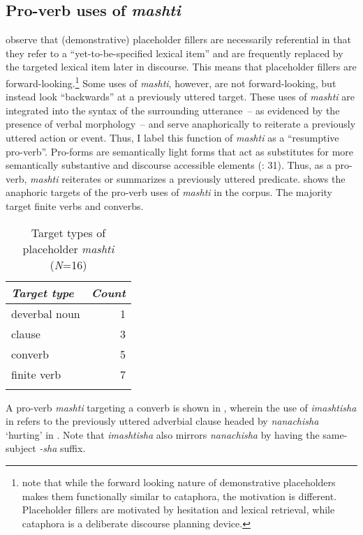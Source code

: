 \documentclass[output=paper]{langscibook}
\begin{document}
\subsection{Pro-verb uses of \textit{mashti}}
\label{sec:rice:3.3}
\citet[500]{HayashiYoon2006} observe that (demonstrative) placeholder fillers are necessarily referential in that they refer to a “yet-to-be-specified lexical item” and are frequently replaced by the targeted lexical item later in discourse. This means that placeholder fillers are forward-looking.\footnote{\citet[500]{HayashiYoon2006} note that while the forward looking nature of demonstrative placeholders makes them functionally similar to cataphora, the motivation is different. Placeholder fillers are motivated by hesitation and lexical retrieval, while cataphora is a deliberate discourse planning device.}  Some uses of \textit{mashti}, however, are not forward-looking, but instead look “backwards” at a previously uttered target. These uses of \textit{mashti} are integrated into the syntax of the surrounding utterance~-- as evidenced by the presence of verbal morphology~-- and serve anaphorically to reiterate a previously uttered action or event. Thus, I label this function of \textit{mashti} as a “resumptive pro-verb”. Pro-forms are semantically light forms that act as substitutes for more semantically substantive and discourse accessible elements (\citealt{Schachter2007}: 31). Thus, as a pro-verb, \textit{mashti} reiterates or summarizes a previously uttered predicate.  shows the anaphoric targets of the pro-verb uses of \textit{mashti} in the corpus. The majority target finite verbs and converbs.


\begin{table}
\begin{tabular}{lr}
\lsptoprule
\textit{Target type} & \textit{Count}\\
\midrule
deverbal noun & 1\\
clause & 3\\
converb & 5\\
finite verb & 7\\
\lspbottomrule
\end{tabular}
\caption{\label{tab:rice:6}Target types of placeholder \textit{mashti} (\textit{N}=16)}
\end{table}

A pro-verb \textit{mashti} targeting a converb is shown in , wherein the use of \textit{imashtisha} in  refers to the previously uttered adverbial clause headed by \textit{nanachisha} ‘hurting’ in . Note that \textit{imashtisha} also mirrors \textit{nanachisha} by having the same-subject \textit{{}-sha} suffix.
\end{document}
